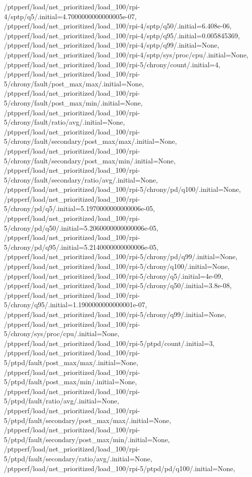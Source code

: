 {    /ptpperf/load/net_prioritized/load_100/rpi-4/sptp/q5/.initial=4.7000000000000005e-07,
    /ptpperf/load/net_prioritized/load_100/rpi-4/sptp/q50/.initial=6.408e-06,
    /ptpperf/load/net_prioritized/load_100/rpi-4/sptp/q95/.initial=0.005845369,
    /ptpperf/load/net_prioritized/load_100/rpi-4/sptp/q99/.initial=None,
    /ptpperf/load/net_prioritized/load_100/rpi-4/sptp/sys/proc/cpu/.initial=None,
    /ptpperf/load/net_prioritized/load_100/rpi-5/chrony/count/.initial=4,
    /ptpperf/load/net_prioritized/load_100/rpi-5/chrony/fault/post_max/max/.initial=None,
    /ptpperf/load/net_prioritized/load_100/rpi-5/chrony/fault/post_max/min/.initial=None,
    /ptpperf/load/net_prioritized/load_100/rpi-5/chrony/fault/ratio/avg/.initial=None,
    /ptpperf/load/net_prioritized/load_100/rpi-5/chrony/fault/secondary/post_max/max/.initial=None,
    /ptpperf/load/net_prioritized/load_100/rpi-5/chrony/fault/secondary/post_max/min/.initial=None,
    /ptpperf/load/net_prioritized/load_100/rpi-5/chrony/fault/secondary/ratio/avg/.initial=None,
    /ptpperf/load/net_prioritized/load_100/rpi-5/chrony/pd/q100/.initial=None,
    /ptpperf/load/net_prioritized/load_100/rpi-5/chrony/pd/q5/.initial=5.1970000000000006e-05,
    /ptpperf/load/net_prioritized/load_100/rpi-5/chrony/pd/q50/.initial=5.2060000000000006e-05,
    /ptpperf/load/net_prioritized/load_100/rpi-5/chrony/pd/q95/.initial=5.2140000000000006e-05,
    /ptpperf/load/net_prioritized/load_100/rpi-5/chrony/pd/q99/.initial=None,
    /ptpperf/load/net_prioritized/load_100/rpi-5/chrony/q100/.initial=None,
    /ptpperf/load/net_prioritized/load_100/rpi-5/chrony/q5/.initial=4e-09,
    /ptpperf/load/net_prioritized/load_100/rpi-5/chrony/q50/.initial=3.8e-08,
    /ptpperf/load/net_prioritized/load_100/rpi-5/chrony/q95/.initial=1.1900000000000001e-07,
    /ptpperf/load/net_prioritized/load_100/rpi-5/chrony/q99/.initial=None,
    /ptpperf/load/net_prioritized/load_100/rpi-5/chrony/sys/proc/cpu/.initial=None,
    /ptpperf/load/net_prioritized/load_100/rpi-5/ptpd/count/.initial=3,
    /ptpperf/load/net_prioritized/load_100/rpi-5/ptpd/fault/post_max/max/.initial=None,
    /ptpperf/load/net_prioritized/load_100/rpi-5/ptpd/fault/post_max/min/.initial=None,
    /ptpperf/load/net_prioritized/load_100/rpi-5/ptpd/fault/ratio/avg/.initial=None,
    /ptpperf/load/net_prioritized/load_100/rpi-5/ptpd/fault/secondary/post_max/max/.initial=None,
    /ptpperf/load/net_prioritized/load_100/rpi-5/ptpd/fault/secondary/post_max/min/.initial=None,
    /ptpperf/load/net_prioritized/load_100/rpi-5/ptpd/fault/secondary/ratio/avg/.initial=None,
    /ptpperf/load/net_prioritized/load_100/rpi-5/ptpd/pd/q100/.initial=None,
}
